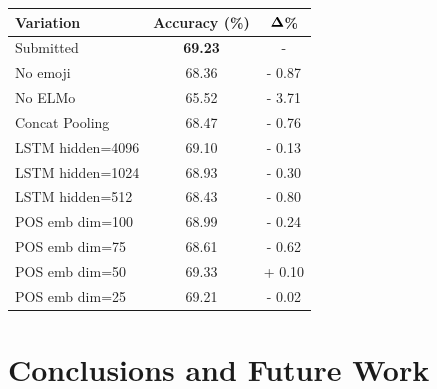 \documentclass[11pt,a4paper]{article}
\begin{document}
\begin{table}[!h]
    \centering
    \footnotesize

    \begin{tabular}{lcc}

        \textbf{Variation} & \textbf{Accuracy (\%)} & $\bf{\Delta}$\textbf{\%} \\
        \hline
        \hline
        Submitted          & \textbf{69.23}         & -               \\
        \hline
        No emoji           & 68.36                  & - 0.87          \\
        \hline
        No ELMo            & 65.52                  & - 3.71          \\
        \hline
        Concat Pooling     & 68.47                  & - 0.76          \\
        \hline
        LSTM hidden=4096   & 69.10                  & - 0.13          \\
        LSTM hidden=1024   & 68.93                  & - 0.30          \\
        LSTM hidden=512    & 68.43                  & - 0.80          \\
        \hline
        POS emb dim=100    & 68.99                  & - 0.24          \\
        POS emb dim=75     & 68.61                  & - 0.62          \\
        POS emb dim=50     & 69.33                  & + 0.10          \\
        POS emb dim=25     & 69.21                  & - 0.02          \\

    \end{tabular}

\end{table}

\section{Conclusions and Future Work}




\end{document}
